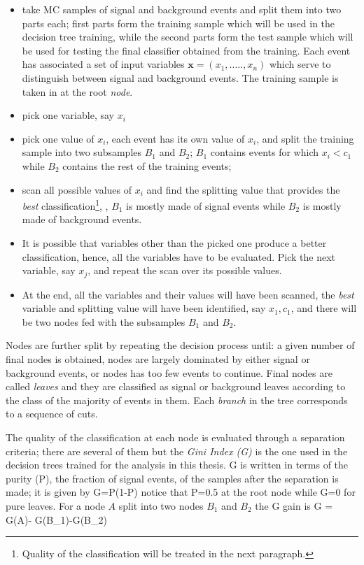 \begin{itemize}
\item take MC samples of signal and background events and split them into two parts each; first parts form the training sample which will be used in the decision tree training, while the second parts form the test sample which will be used for testing the final classifier obtained from the training. Each event has associated a set of input variables $\textbf{x}=(x_1,.....,x_n)$ which serve to distinguish between signal and background events. The training sample is taken in at the root \textit{node}. 
\item pick one variable, say $x_i$
\item pick one value of $x_i$, each event has its own value of $x_i$, and split the training sample into two subsamples $B_1$ and $B_2$; $B_1$ contains events for which $x_i< c_1$ while $B_2$ contains the rest of the training events;
\item scan all possible values of $x_i$ and find the splitting value that provides the \textit{best} classification\footnote{ Quality of the classification will be treated in the next paragraph.}, \ie, $B_1$ is mostly made of signal events while $B_2$ is mostly made of background events.
\item It is possible that variables other than the picked one produce a better classification, hence, all the variables have to be evaluated. Pick the next variable, say $x_j$, and repeat the scan over its possible values.
\item At the end, all the variables and their values will have been scanned, the \textit{best} variable and splitting value will have been identified, say $x_1, c_1$, and there will be two nodes fed with the subsamples $B_1$ and $B_2$. 
\end{itemize}

Nodes are further split by repeating the decision process until: a given number of final nodes is obtained, nodes are largely dominated by either signal or background events, or nodes has too few events to continue. Final nodes are called \textit{leaves} and they are classified as signal or background leaves according to the class of the majority of events in them. Each \textit{branch} in the tree corresponds to a sequence of cuts. 

The quality of the classification at each node is evaluated through a separation criteria; there are several of them but the \textit{Gini Index (G)} is the one used in the decision trees trained for the analysis in this thesis. G is written in terms of the purity (P), \ie the fraction of signal events, of the samples after the separation is made; it is given by
\beqn
G=P(1-P)
\eeqn
\noindent notice that P=0.5 at the root node while G=0 for pure leaves. For a node $A$ split into two nodes $B_1$ and $B_2$ the G gain is
\beqn
\Delta G = G(A)- G(B_1)-G(B_2)
\eeqn

